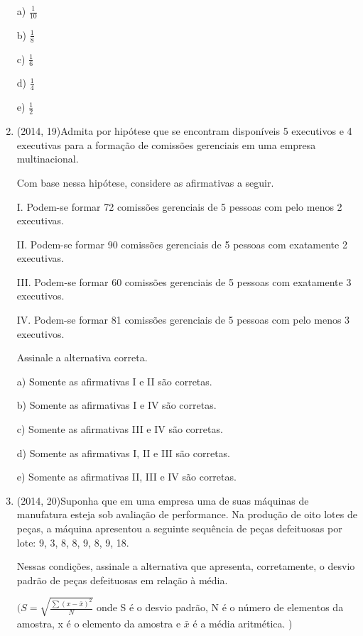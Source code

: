 \documentclass{article}
\begin{document}
\begin{enumerate}
a) $\frac{1}{10}$

b) $\frac{1}{8}$

c) $\frac{1}{6}$

d) $\frac{1}{4}$

e) $\frac{1}{2}$\newline






\item(2014, 19)Admita por hipótese que se encontram disponíveis 5 executivos e 4 executivas para a formação de comissões gerenciais em uma empresa multinacional.

Com base nessa hipótese, considere as afirmativas a seguir.

I. Podem-se formar 72 comissões gerenciais de 5 pessoas com pelo menos 2 executivas.

II. Podem-se formar 90 comissões gerenciais de 5 pessoas com exatamente 2 executivas.

III. Podem-se formar 60 comissões gerenciais de 5 pessoas com exatamente 3 executivos.

IV. Podem-se formar 81 comissões gerenciais de 5 pessoas com pelo menos 3 executivos.

Assinale a alternativa correta.

a) Somente as afirmativas I e II são corretas.

b) Somente as afirmativas I e IV são corretas.

c) Somente as afirmativas III e IV são corretas.

d) Somente as afirmativas I, II e III são corretas.

e) Somente as afirmativas II, III e IV são corretas.\newline




\item(2014, 20)Suponha que em uma empresa uma de suas máquinas de manufatura esteja sob avaliação de performance. Na produção de oito lotes de peças, a máquina apresentou a seguinte sequência de peças defeituosas por lote: 9, 3, 8, 8, 9, 8, 9, 18.

Nessas condições, assinale a alternativa que apresenta, corretamente, o desvio padrão de peças defeituosas em relação à média.

$( S= \sqrt{\frac{\sum( x - \bar x)^2}{N}}$ onde S é o desvio padrão, N é o número de elementos da amostra, x é o elemento da amostra e $\bar x$ é a média aritmética. )


\end{enumerate}
\end{document}
